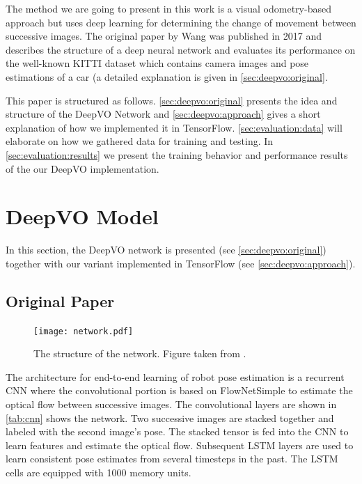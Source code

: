 \documentclass[a4paper,11pt]{article}
\begin{document}
The method we are going to present in this work is a visual odometry-based
approach but uses deep learning for determining the change of movement between
successive images. The original paper by Wang \etal{} \cite{wang2017deepvo} was
published in 2017 and describes the structure of a deep neural network
and evaluates its performance on the well-known KITTI dataset
which contains camera images and pose estimations of a car (a detailed
explanation is given in \autoref{sec:deepvo:original}.

This paper is structured as follows. \autoref{sec:deepvo:original} presents
the idea and structure of the DeepVO Network and
\autoref{sec:deepvo:approach} gives a short explanation of how we
implemented it in TensorFlow. \autoref{sec:evaluation:data} will elaborate
on how we gathered data for training and testing. In
\autoref{sec:evaluation:results} we present the training behavior and
performance results of the our DeepVO implementation.


\section{DeepVO Model}
\label{sec:deepvo}
In this section, the DeepVO network is presented (see \autoref{sec:deepvo:original}) together with our variant implemented in TensorFlow (see \autoref{sec:deepvo:approach}).


\subsection{Original Paper}
\label{sec:deepvo:original}

\begin{figure}[tbh]
    \centering
    \texttt{[image: network.pdf]}
    \caption{The structure of the network. Figure taken from \cite{wang2017deepvo}.}
    \label{fig:network}
\end{figure}


The architecture for end-to-end learning of robot pose estimation is a recurrent
CNN where the convolutional portion is based on FlowNetSimple \cite{flownet} to
estimate the optical flow between successive images. The convolutional layers
are shown in \autoref{tab:cnn}
shows the network. Two successive images are stacked together and labeled with
the second image's pose. The stacked tensor is fed into the CNN to learn
features and estimate the optical flow. Subsequent LSTM layers are used to learn
consistent pose estimates from several timesteps in the past. The LSTM cells are
equipped with 1000 memory units.
\end{document}

